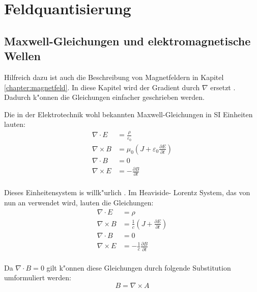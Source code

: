 \chapter{Feldquantisierung\label{chapter:feldquantisierung}}
\begin{refsection}

\printbibliography[heading=subbibliography]
\end{refsection}

\section{Maxwell-Gleichungen und elektromagnetische Wellen}

Hilfreich dazu ist auch die Beschreibung von Magnetfeldern in Kapitel \ref{chapter:magnetfeld}. In diese Kapitel wird der Gradient durch $\nabla$ ersetzt \cite{skript:nabla}. Dadurch k"onnen die Gleichungen einfacher geschrieben werden. 

Die in der Elektrotechnik wohl bekannten Maxwell-Gleichungen in SI Einheiten lauten:
\begin{equation}
\begin{split}
\nabla\cdot E &= \frac{\rho}{\varepsilon_0} \\
\nabla\times B &= \mu_0( J  + \varepsilon_0\frac{\partial E}{\partial t}) \\
\nabla\cdot B &=0 \\
\nabla\times E &= -\frac{\partial B }{\partial t}\\
\end{split}
\end{equation}

Dieses Einheitensystem is willk"urlich \cite{skript:em_units}. Im Heaviside-
Lorentz System, das von nun an verwendet wird, lauten die Gleichungen:
\begin{equation}
\begin{split}
\nabla\cdot E &= \rho \\
\nabla\times B &= \frac{1}{c}( J  + \frac{\partial E}{\partial t}) \\
\nabla\cdot B &=0 \\
\nabla\times E &= -\frac{1}{c} \frac{\partial B }{\partial t}\\
\end{split}
\end{equation}

Da $\nabla \cdot B = 0 $ gilt k"onnen diese Gleichungen durch folgende Substitution umformuliert werden:
\begin{equation}
B = \nabla\times A 
\end{equation}

